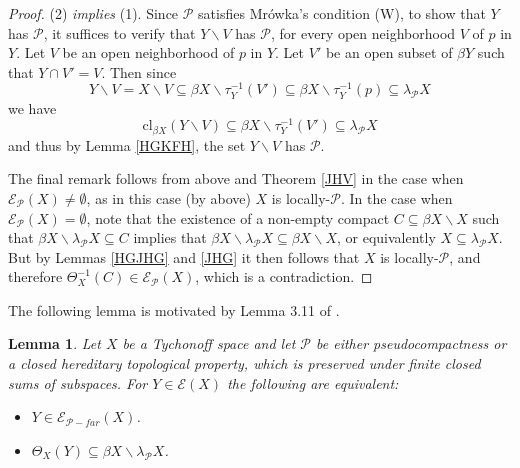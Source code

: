\documentclass{amsart}
\newtheorem{lemma}[theorem]{Lemma}
\theoremstyle{definition}
\theoremstyle{remark}
\theoremstyle{notation}
\numberwithin{equation}{section}
\begin{document}
\begin{proof}
(2) {\em  implies} (1).  Since ${\mathcal P}$  satisfies Mr\'{o}wka's condition (W), to show that $Y$ has ${\mathcal P}$, it suffices to verify that $Y\backslash V$ has  ${\mathcal P}$, for every open neighborhood $V$ of $p$ in $Y$. Let $V$ be an
open neighborhood of $p$ in $Y$. Let $V'$ be an open subset of $\beta Y$ such that $Y\cap V'=V$. Then since
\[Y\backslash V=X\backslash V\subseteq\beta X\backslash\tau^{-1}_Y(V')\subseteq\beta X\backslash\tau^{-1}_Y(p)\subseteq\lambda_{{\mathcal P}} X\]
we have
\[\mbox{cl}_{\beta X}(Y\backslash V)\subseteq\beta X\backslash\tau^{-1}_Y(V')\subseteq\lambda_{{\mathcal P}} X\]
and thus by Lemma \ref{HGKFH}, the set $Y\backslash V$  has ${\mathcal P}$.

The final remark follows  from above and Theorem \ref{JHV} in the case  when ${\mathscr E}_{{\mathcal P}}(X)\neq\emptyset$, as in this case (by above) $X$ is locally-${\mathcal P}$.  In the case when  ${\mathscr E}_{{\mathcal P}}(X)=\emptyset$, note that the existence of a non-empty compact
$C\subseteq\beta X\backslash X$ such that $\beta X\backslash\lambda_{{\mathcal P}} X\subseteq C$ implies that $\beta X\backslash\lambda_{{\mathcal P}} X\subseteq \beta X\backslash X$, or equivalently $X\subseteq\lambda_{{\mathcal P}} X$. But by Lemmas
\ref{HGJHG} and  \ref{JHG} it then follows that $X$ is locally-$\mathcal{P}$, and therefore $\Theta_X^{-1}(C)\in{\mathscr E}_{{\mathcal P}}(X)$, which is a contradiction.
\end{proof}

The following lemma is motivated by Lemma 3.11 of \cite{Ko2}.

\begin{lemma}\label{SGFH}
Let $X$ be a Tychonoff space and let  ${\mathcal P}$ be either pseudocompactness or a  closed hereditary  topological property,
which is preserved under finite closed sums of subspaces. For $Y\in{\mathscr E}(X)$ the following are equivalent:
\begin{itemize}
\item[\rm(1)] $Y\in{\mathscr E}_{{\mathcal P}-far}(X)$.
\item[\rm(2)] $\Theta_X(Y)\subseteq\beta X\backslash\lambda_{{\mathcal P}} X$.
\end{itemize}
\end{lemma}
\end{document}
